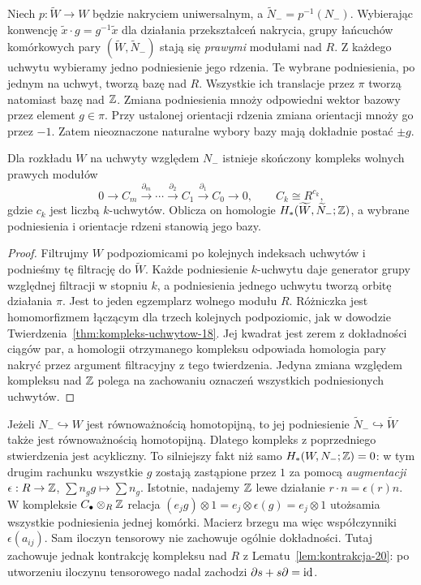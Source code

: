 Niech $p:\widetilde W\to W$ będzie nakryciem uniwersalnym,
a $\widetilde N_-=p^{-1}(N_-)$. Wybierając konwencję
$\widetilde x\cdot g=g^{-1}\widetilde x$ dla działania
przekształceń nakrycia, grupy łańcuchów komórkowych pary
$(\widetilde W,\widetilde N_-)$ stają się \emph{prawymi}
modułami nad $R$. Z każdego uchwytu wybieramy jedno
podniesienie jego rdzenia. Te wybrane podniesienia, po jednym
na uchwyt, tworzą bazę nad $R$. Wszystkie ich translacje przez
$\pi$ tworzą natomiast bazę nad $\mathbb{Z}$. Zmiana podniesienia mnoży
odpowiedni wektor bazowy przez element $g\in\pi$.
Przy ustalonej orientacji rdzenia zmiana orientacji mnoży go
przez $-1$. Zatem nieoznaczone naturalne wybory bazy
mają dokładnie postać $\pm g$.

\begin{samepage}
\begin{stwierdzenie}
\label{prop:kompleks-pi-20}
Dla rozkładu $W$ na uchwyty względem $N_-$ istnieje
skończony kompleks wolnych prawych modułów
\[
 0\longrightarrow C_m\xrightarrow{\partial_m}\cdots
 \xrightarrow{\partial_2}C_1\xrightarrow{\partial_1}C_0
 \longrightarrow0,
 \qquad C_k\cong R^{c_k},
\]
gdzie $c_k$ jest liczbą $k$-uchwytów. Oblicza on homologie
$H_*(\widetilde W,\widetilde N_-;\mathbb{Z})$, a wybrane podniesienia
i orientacje rdzeni stanowią jego bazy.
\end{stwierdzenie}
\end{samepage}
\begin{proof}
Filtrujmy $W$ podpoziomicami po kolejnych indeksach uchwytów
i podnieśmy tę filtrację do $\widetilde W$. Każde podniesienie
$k$-uchwytu daje generator grupy względnej filtracji w stopniu
$k$, a podniesienia jednego uchwytu tworzą orbitę działania
$\pi$. Jest to jeden egzemplarz wolnego modułu $R$.
Różniczka jest homomorfizmem łączącym dla trzech kolejnych
podpoziomic, jak w dowodzie
Twierdzenia~\ref{thm:kompleks-uchwytow-18}. Jej kwadrat
jest zerem z dokładności ciągów par, a homologii otrzymanego
kompleksu odpowiada homologia pary nakryć przez argument
filtracyjny z tego twierdzenia. Jedyna zmiana względem
kompleksu nad $\mathbb{Z}$ polega na zachowaniu oznaczeń wszystkich
podniesionych uchwytów.
\end{proof}

\begin{uwaga}
Jeżeli $N_-\hookrightarrow W$ jest równoważnością
homotopijną, to jej podniesienie
$\widetilde N_-\hookrightarrow\widetilde W$ także jest
równoważnością homotopijną. Dlatego kompleks z
poprzedniego stwierdzenia jest acykliczny. To silniejszy
fakt niż samo $H_*(W,N_-;\mathbb{Z})=0$: w tym drugim rachunku
wszystkie $g$ zostają zastąpione przez $1$ za pomocą
\emph{augmentacji} $\epsilon:R\to\mathbb{Z}$, $\sum n_g g\mapsto
\sum n_g$.
Istotnie, nadajemy $\mathbb{Z}$ lewe działanie $r\cdot n=\epsilon(r)n$.
W kompleksie $C_\bullet\otimes_R\mathbb{Z}$ relacja
$(e_jg)\otimes1=e_j\otimes\epsilon(g)=e_j\otimes1$
utożsamia wszystkie podniesienia jednej komórki.
Macierz brzegu ma więc współczynniki $\epsilon(a_{ij})$.
Sam iloczyn tensorowy nie zachowuje ogólnie dokładności.
Tutaj zachowuje jednak kontrakcję kompleksu nad $R$
z Lematu~\ref{lem:kontrakcja-20}: po utworzeniu iloczynu
tensorowego nadal zachodzi $\partial s+s\partial=\mathrm{id}$.
\end{uwaga}

